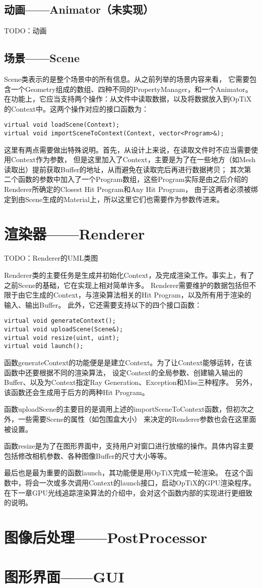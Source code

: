\subsection{动画——Animator（未实现）}
TODO：动画

\subsection{场景——Scene}
Scene类表示的是整个场景中的所有信息。从之前列举的场景内容来看，
它需要包含一个Geometry组成的数组、四种不同的PropertyManager，和一个Animator。
在功能上，它应当支持两个操作：从文件中读取数据，以及将数据放入到OpTiX的Context中。这两个操作对应的接口函数为：
\lstset{language=C++}
\begin{lstlisting}
virtual void loadScene(Context);
virtual void importSceneToContext(Context, vector<Program>&);
\end{lstlisting}

这里有两点需要做出特殊说明。首先，从设计上来说，在读取文件时不应当需要使用Context作为参数，
但是这里加入了Context，主要是为了在一些地方（如Mesh读取出）提前获取Buffer的地址，从而避免在读取完后再进行数据拷贝；
其次第二个函数的参数中加入了一个Program数组，这些Program实际是由之后介绍的Renderer所确定的Closest Hit Program和Any Hit Program，
由于这两者必须被绑定到由Scene生成的Material上，所以这里它们也需要作为参数传进来。

\section{渲染器——Renderer}
TODO：Renderer的UML类图

Renderer类的主要任务是生成并初始化Context，及完成渲染工作。事实上，有了之前Scene的基础，它在实现上相对简单许多。
Renderer需要维护的数据包括但不限于由它生成的Context，与渲染算法相关的Hit Program，以及所有用于渲染的输入、输出Buffer。
此外，它还需要支持以下的四个接口函数：

\lstset{language=C++}
\begin{lstlisting}
virtual void generateContext();
virtual void uploadScene(Scene&);
virtual void resize(uint, uint);
virtual void launch();
\end{lstlisting}

函数generateContext的功能便是是建立Context。为了让Context能够运转，在该函数中还要根据不同的渲染算法，
设定Context的全局参数、创建输入输出的Buffer、以及为Context指定Ray Generation、Exception和Miss三种程序。
另外，该函数还会生成用于后方的两种Hit Program。

函数uploadScene的主要目的是调用上述的importSceneToContext函数，但初次之外，一些需要Scene的属性（如包围盒大小）
来决定的Renderer参数也会在这里面被设置。

函数resize是为了在图形界面中，支持用户对窗口进行放缩的操作。具体内容主要包括修改相机参数、各种图像Buffer的尺寸大小等等。

最后也是最为重要的函数launch，其功能便是用OpTiX完成一轮渲染。
在这个函数中，将会一次或多次调用Context的launch接口，启动OpTiX的GPU渲染程序。
在下一章GPU光线追踪渲染算法的介绍中，会对这个函数内部的实现进行更细致的说明。

\section{图像后处理——PostProcessor}



\section{图形界面——GUI}

